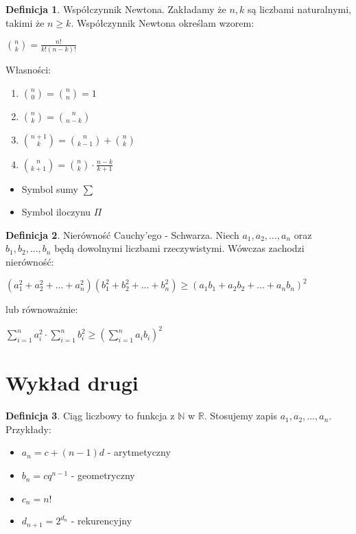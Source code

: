 \documentclass{article}
\theoremstyle{definition}
\newtheorem{de}{Definicja}[subsection]
\theoremstyle{definition}
\theoremstyle{definition}
\theoremstyle{definition}
\begin{document}
\begin{de}
    Współczynnik Newtona. Zakładamy że $n,k$ są liczbami naturalnymi,
    takimi że $n\geq k$. Współczynnik Newtona określam wzorem:
    \begin{center}
        $\binom{n}{k}=\frac{n!}{k!(n-k)!}$
    \end{center}
    Własności:
    \begin{enumerate}
        \item $\binom{n}{0}=\binom{n}{n}=1$
        \item $\binom{n}{k}=\binom{n}{n-k}$
        \item $\binom{n+1}{k}=\binom{n}{k-1}+\binom{n}{k}$
        \item $\binom{n}{k+1}=\binom{n}{k}\cdot \frac{n-k}{k+1}$
    \end{enumerate}
\end{de}

\begin{itemize}
    \item Symbol sumy $\sum$
    \item Symbol iloczynu $\Pi$
\end{itemize}

\begin{de}
    Nierówność Cauchy'ego - Schwarza. Niech $a_1, a_2, \dots, a_n$ oraz $b_1, b_2, \dots, b_n$ będą dowolnymi liczbami rzeczywistymi.
    Wówczas zachodzi nierówność:
    \begin{center}
        $(a_1^2+a_2^2+\dots+a_n^2)(b_1^2+b_2^2+\dots+b_n^2)\geq(a_1b_1+a_2b_2+\dots+a_nb_n)^2$
    \end{center}
    lub równoważnie:
    \begin{center}
        $\sum_{i=1}^{n} a_i^2 \cdot \sum_{i=1}^{n} b_i^2 \geq \left(\sum_{i=1}^{n} a_ib_i\right)^2$
    \end{center}
\end{de}

\section{Wykład drugi}

\begin{de}
    Ciąg liczbowy to funkcja z $\mathbb{N}$ w $\mathbb{R}$. Stosujemy zapis $a_1,a_2,\dots,a_n$. Przykłady:
    \begin{itemize}
        \item $a_n=c+(n-1)d$ - arytmetyczny
        \item $b_n=cq^{n-1}$ - geometryczny
        \item $c_n=n!$
        \item $d_{n+1}=2^{d_n}$ - rekurencyjny
    \end{itemize}
\end{de}
\end{document}
